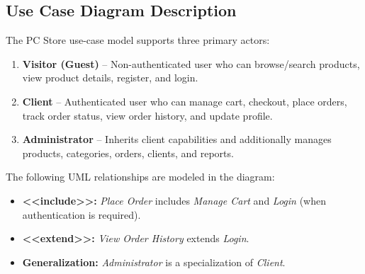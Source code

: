 \documentclass[12pt,a4paper]{report}
\begin{document}
\subsection{Use Case Diagram Description}
The PC Store use-case model supports three primary actors:
\begin{enumerate}[noitemsep]
  \item \textbf{Visitor (Guest)} -- Non-authenticated user who can browse/search products, view product details, register, and login.
  \item \textbf{Client} -- Authenticated user who can manage cart, checkout, place orders, track order status, view order history, and update profile.
  \item \textbf{Administrator} -- Inherits client capabilities and additionally manages products, categories, orders, clients, and reports.
\end{enumerate}

The following UML relationships are modeled in the diagram:
\begin{itemize}[noitemsep]
  \item \textbf{<<include>>:} \textit{Place Order} includes \textit{Manage Cart} and \textit{Login} (when authentication is required).
  \item \textbf{<<extend>>:} \textit{View Order History} extends \textit{Login}.
  \item \textbf{Generalization:} \textit{Administrator} is a specialization of \textit{Client}.
\end{itemize}
\end{document}
